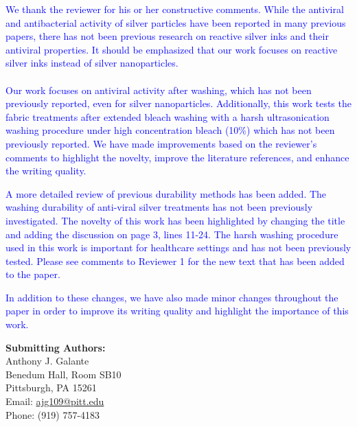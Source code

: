 \documentclass[12pt]{letter}
\newcommand{\blue}[1]{\textcolor{blue}{#1}} %
\begin{document}
\blue{We thank the reviewer for his or her constructive comments. While the antiviral and antibacterial activity of silver particles have been reported in many previous papers, there has not been previous research on reactive silver inks and their antiviral properties.  It should be emphasized that our work focuses on reactive silver inks instead of silver nanoparticles.\\ \\    
Our work focuses on antiviral activity after washing, which has not been previously reported, even for silver nanoparticles.  
Additionally, this work tests the fabric treatments after extended bleach washing with a harsh ultrasonication washing procedure 
under high concentration bleach (10\%) which has not been previously reported.
We have made improvements based on the reviewer's comments to highlight the novelty, improve the literature references, and enhance the writing quality. }


\blue{A more detailed review of previous durability methods has been added.
The washing durability of anti-viral silver treatments has not been previously investigated. The novelty of this work has been highlighted by changing the title and adding the discussion on page 3, lines 11-24. The harsh washing procedure used in this work is important for healthcare settings and has not been previously tested.
Please see comments to Reviewer 1 for the new text that has been added to the paper.}







\blue{In addition to these changes, we have also made minor changes throughout the paper in order to improve its writing quality and highlight the importance of this work.}



\newpage


\textbf{Submitting Authors:}\\
Anthony J. Galante\\
Benedum Hall, Room SB10 \\
Pittsburgh, PA 15261\\
Email:  \href{mailto:ajg109@pitt.edu}{ajg109@pitt.edu}\\
Phone: (919) 757-4183\\
\end{document}
